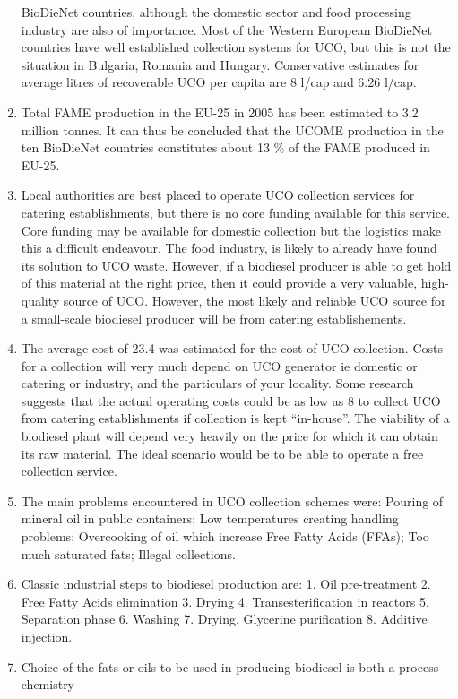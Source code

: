 \documentclass[11pt,fleqn,oneside]{book} %
\begin{document}
\begin{enumerate}
	BioDieNet countries, although the domestic sector and food processing industry are also
	of importance. Most of the Western European BioDieNet countries have well established
	collection systems for UCO, but this is not the situation in Bulgaria, Romania and
	Hungary. Conservative estimates for average litres of recoverable UCO per capita are 8
	l/cap and 6.26 l/cap.
	\item Total FAME production in the EU-25 in 2005 has been estimated to 3.2 million tonnes. It
	can thus be concluded that the UCOME production in the ten BioDieNet countries
	constitutes about 13 \% of the FAME produced in EU-25.
	\item Local authorities are best placed to operate UCO collection services for catering
	establishments, but there is no core funding available for this service. Core funding may
	be available for domestic collection but the logistics make this a difficult endeavour. The
	food industry, is likely to already have found its solution to UCO waste. However, if a
	biodiesel producer is able to get hold of this material at the right price, then it could
	provide a very valuable, high-quality source of UCO. However, the most likely and
	reliable UCO source for a small-scale biodiesel producer will be from catering
	establishements.
	\item The average cost of 23.4 %
	was estimated for the cost of UCO collection. Costs for a
	collection will very much depend on UCO generator ie domestic or catering or industry,
	and the particulars of your locality. Some research suggests that the actual operating
	costs could be as low as 8 %
	to collect UCO from catering establishments if collection is
	kept “in-house”. The viability of a biodiesel plant will depend very heavily on the price for
	which it can obtain its raw material. The ideal scenario would be to be able to operate a
	free collection service.
	\item The main problems encountered in UCO collection schemes were: Pouring of mineral oil
	in public containers; Low temperatures creating handling problems; Overcooking of oil which 
	increase Free Fatty Acids (FFAs); Too much saturated fats; Illegal collections.
	\item Classic industrial steps to biodiesel production are: 1. Oil pre-treatment 2. Free Fatty
	Acids elimination 3. Drying 4. Transesterification in reactors 5. Separation phase 6.
	Washing 7. Drying. Glycerine purification 8. Additive injection.
	\item Choice of the fats or oils to be used in producing biodiesel is both a process chemistry

\end{enumerate}
\end{document}
